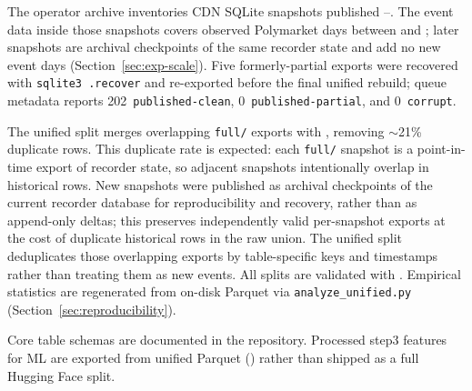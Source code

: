 The operator archive inventories \OpenMarketSnapshots{} CDN SQLite snapshots
published \OpenMarketCollectionStart{}--\OpenMarketCollectionEnd{}. The event
data inside those snapshots covers \OpenMarketPolyObservedDays{} observed
Polymarket days between \OpenMarketDataFirstDay{} and \OpenMarketDataLastDay{};
later snapshots are archival checkpoints of the same recorder state and add no
new event days (Section~\ref{sec:exp-scale}). Five formerly-partial
exports were recovered with \texttt{sqlite3 .recover} and re-exported before
the final unified rebuild; queue metadata reports 202~\texttt{published-clean},
0~\texttt{published-partial}, and 0~\texttt{corrupt}.

The unified split merges overlapping \texttt{full/} exports with
, removing ${\sim}$21\% duplicate
rows. This duplicate rate is expected: each \texttt{full/} snapshot is a
point-in-time export of recorder state, so adjacent snapshots intentionally
overlap in historical rows. New snapshots were published as archival checkpoints
of the current recorder database for reproducibility and recovery, rather than
as append-only deltas; this preserves independently valid per-snapshot exports
at the cost of duplicate historical rows in the raw union. The unified split
deduplicates those overlapping exports by table-specific keys and timestamps
rather than treating them as new events. All splits are validated with
. Empirical statistics are regenerated
from on-disk Parquet via \texttt{analyze\_unified.py} (Section~\ref{sec:reproducibility}).

Core table schemas are documented in the repository. Processed step3 features
for ML are exported from unified Parquet () rather
than shipped as a full Hugging Face split.
